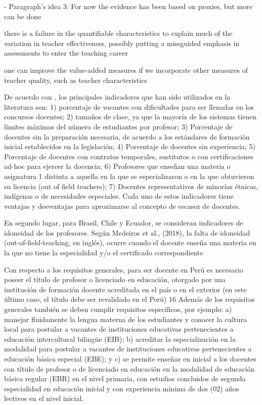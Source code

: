 - Paragraph's idea 3: For now the evidence has been based on proxies, but more can be done

there is a failure in the quantifiable characteristics to explain much of the variation in teacher effectiveness, possibly putting a missguided emphasis in assessments to enter the teaching career \citep{Hanushek_et_al_2012}


one can improve the value-added measures if we incorporate other measures of teacher quality, such as teacher characteristics \citep{Chetty_et_al_2014a}

De acuerdo con \citep{Sutcher_et_al_2016}, los principales indicadores que han sido utilizados en la literatura son: 1) porcentaje de vacantes con dificultades para ser llenadas en los concursos docentes; 2) tamaños de clase, ya que la mayoría de los sistemas tienen límites máximos del número de estudiantes por profesor; 3) Porcentaje de docentes sin la preparación necesaria, de acuerdo a los estándares de formación inicial establecidos en la legislación; 4) Porcentaje de docentes sin experiencia; 5) Porcentaje de docentes con contratos temporales, sustitutos o con certificaciones ad-hoc para ejercer la docencia; 6) Profesores que enseñan una materia o asignatura 1 distinta a aquella en la que se especializaron o en la que obtuvieron su licencia (out of field teachers); 7) Docentes representativos de minorías étnicas, indígenas o de necesidades especiales. Cada uno de estos indicadores tiene ventajas y desventajas para aproximarse al concepto de escasez de docentes.

\citep{Bertoni_et_al_2020a}
En segundo lugar, para Brasil, Chile y Ecuador, se consideran indicadores de idoneidad de los profesores. Según Medeiros et al., (2018), la falta de idoneidad (out-of-field-teaching, en inglés), ocurre cuando el docente enseña una materia en la que no tiene la especialidad y/o el certificado correspondiente

Con respecto a los requisitos generales, para ser docente en Perú es necesario poseer el título de profesor o licenciado en educación, otorgado por una institución de formación docente acreditada en el país o en el exterior (en este último caso, el título debe ser revalidado en el Perú) 16 Además de los requisitos generales también se deben cumplir requisitos específicos, por ejemplo: a) manejar fluidamente la lengua materna de los estudiantes y conocer la cultura local para postular a vacantes de instituciones educativas pertenecientes a educación intercultural bilingüe (EIB); b) acreditar la especialización en la modalidad para postular a vacantes de instituciones educativas pertenecientes a educación básica especial (EBE); y c) se permite enseñar en inicial a los docentes con título de profesor o de licenciado en educación en la modalidad de educación básica regular (EBR) en el nivel primaria, con estudios concluidos de segunda especialidad en educación inicial y con experiencia mínima de dos (02) años lectivos en el nivel inicial.

